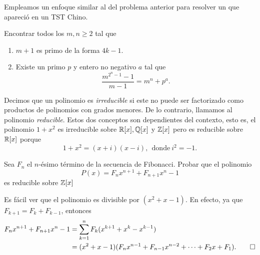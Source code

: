 \begin{note}
    Empleamos un enfoque similar al del problema anterior para resolver un que apareció en un TST Chino.

    Encontrar todos los $m, n \geq 2$ tal que
    \begin{enumerate}
        \item $m + 1$ es primo de la forma $4k - 1$.
        \item Existe un primo $p$ y entero no negativo $a$ tal que
        \[
            \frac{m^{2^n - 1} - 1}{m - 1} = m^n + p^a.
        \]
    \end{enumerate}
\end{note}

Decimos que un polinomio es \textit{irreducible} si este no puede ser factorizado como productos de polinomios con grados menores.
De lo contrario, llamamos al polinomio \textit{reducible}.
Estos dos conceptos son dependientes del contexto, esto es, el polinomio $1 +x^2$ es irreducible sobre $\mathbb{R}[x], \mathbb{Q}[x]$ y $\mathbb{Z}[x]$ pero es reducible sobre $\mathbb{R}[x]$ porque
\[
    1 + x^2 = (x + i)(x - i),\ \  \text{donde} \ i^2 = -1.
\]

\begin{example}
    Sea $F_n$ el $n$-ésimo término de la secuencia de Fibonacci.
    Probar que el polinomio
    \[
        P(x) = F_n x^{n + 1} + F_{n + 1} x^n - 1
    \]
    es reducible sobre $\mathbb{Z}[x]$
\end{example}
\begin{solution}
    Es fácil ver que el polinomio es divisible por $(x^2 + x - 1)$.
    En efecto, ya que $F_{k + 1} = F_k + F_{k - 1}$, entonces
    \begin{align*}
        F_n x^{n + 1} + F_{n + 1} x^n - 1 &= \sum_{k = 1}^{n} F_k (x^{k + 1} + x^k - x^{k - 1})\\
        &= (x^2 + x - 1)(F_n x^{n - 1} + F_{n - 1} x^{n - 2} + \cdots + F_2 x + F_1). \qedhere
    \end{align*}
\end{solution}

